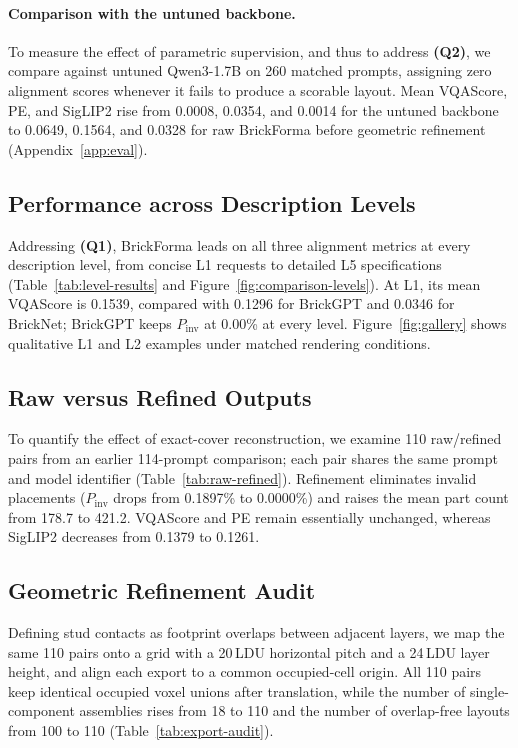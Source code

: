 \paragraph{Comparison with the untuned backbone.}
To measure the effect of parametric supervision, and thus to address \textbf{(Q2)}, we compare against untuned Qwen3-1.7B on 260 matched prompts, assigning zero alignment scores whenever it fails to produce a scorable layout. Mean VQAScore, PE, and SigLIP2 rise from 0.0008, 0.0354, and 0.0014 for the untuned backbone to 0.0649, 0.1564, and 0.0328 for raw BrickForma before geometric refinement (Appendix~\ref{app:eval}).

\subsection{Performance across Description Levels}

Addressing \textbf{(Q1)}, BrickForma leads on all three alignment metrics at every description level, from concise L1 requests to detailed L5 specifications (Table~\ref{tab:level-results} and Figure~\ref{fig:comparison-levels}). At L1, its mean VQAScore is 0.1539, compared with 0.1296 for BrickGPT and 0.0346 for BrickNet; BrickGPT keeps $P_{\mathrm{inv}}$ at 0.00\% at every level. Figure~\ref{fig:gallery} shows qualitative L1 and L2 examples under matched rendering conditions.



\subsection{Raw versus Refined Outputs}

To quantify the effect of exact-cover reconstruction, we examine 110 raw/refined pairs from an earlier 114-prompt comparison; each pair shares the same prompt and model identifier (Table~\ref{tab:raw-refined}). Refinement eliminates invalid placements ($P_{\mathrm{inv}}$ drops from 0.1897\% to 0.0000\%) and raises the mean part count from 178.7 to 421.2. VQAScore and PE remain essentially unchanged, whereas SigLIP2 decreases from 0.1379 to 0.1261.

\subsection{Geometric Refinement Audit}
\label{sec:diagnostics}
Defining stud contacts as footprint overlaps between adjacent layers, we map the same 110 pairs onto a grid with a 20\,LDU horizontal pitch and a 24\,LDU layer height, and align each export to a common occupied-cell origin. All 110 pairs keep identical occupied voxel unions after translation, while the number of single-component assemblies rises from 18 to 110 and the number of overlap-free layouts from 100 to 110 (Table~\ref{tab:export-audit}).


